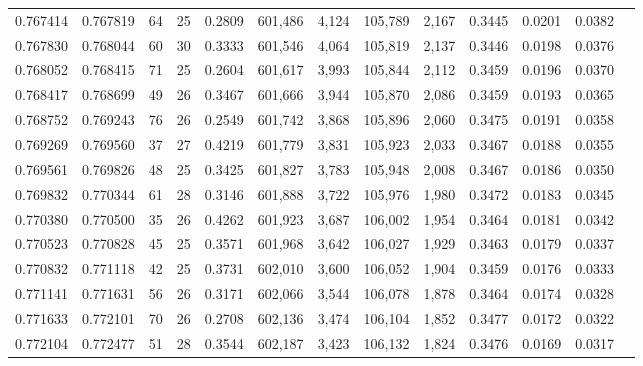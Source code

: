 \begin{tabular}{rrrrrrrrrrrrr}
0.767414 & 0.767819 &  64 &  25 &                                     0.2809 & 601,486 &   4,124 & 105,789 &   2,167 & 0.3445 & 0.0201 & 0.0382 \\
0.767830 & 0.768044 &  60 &  30 &                                     0.3333 & 601,546 &   4,064 & 105,819 &   2,137 & 0.3446 & 0.0198 & 0.0376 \\
0.768052 & 0.768415 &  71 &  25 &                                     0.2604 & 601,617 &   3,993 & 105,844 &   2,112 & 0.3459 & 0.0196 & 0.0370 \\
0.768417 & 0.768699 &  49 &  26 &                                     0.3467 & 601,666 &   3,944 & 105,870 &   2,086 & 0.3459 & 0.0193 & 0.0365 \\
0.768752 & 0.769243 &  76 &  26 &                                     0.2549 & 601,742 &   3,868 & 105,896 &   2,060 & 0.3475 & 0.0191 & 0.0358 \\
0.769269 & 0.769560 &  37 &  27 &                                     0.4219 & 601,779 &   3,831 & 105,923 &   2,033 & 0.3467 & 0.0188 & 0.0355 \\
0.769561 & 0.769826 &  48 &  25 &                                     0.3425 & 601,827 &   3,783 & 105,948 &   2,008 & 0.3467 & 0.0186 & 0.0350 \\
0.769832 & 0.770344 &  61 &  28 &                                     0.3146 & 601,888 &   3,722 & 105,976 &   1,980 & 0.3472 & 0.0183 & 0.0345 \\
0.770380 & 0.770500 &  35 &  26 &                                     0.4262 & 601,923 &   3,687 & 106,002 &   1,954 & 0.3464 & 0.0181 & 0.0342 \\
0.770523 & 0.770828 &  45 &  25 &                                     0.3571 & 601,968 &   3,642 & 106,027 &   1,929 & 0.3463 & 0.0179 & 0.0337 \\
0.770832 & 0.771118 &  42 &  25 &                                     0.3731 & 602,010 &   3,600 & 106,052 &   1,904 & 0.3459 & 0.0176 & 0.0333 \\
0.771141 & 0.771631 &  56 &  26 &                                     0.3171 & 602,066 &   3,544 & 106,078 &   1,878 & 0.3464 & 0.0174 & 0.0328 \\
0.771633 & 0.772101 &  70 &  26 &                                     0.2708 & 602,136 &   3,474 & 106,104 &   1,852 & 0.3477 & 0.0172 & 0.0322 \\
0.772104 & 0.772477 &  51 &  28 &                                     0.3544 & 602,187 &   3,423 & 106,132 &   1,824 & 0.3476 & 0.0169 & 0.0317 \\

\end{tabular}
